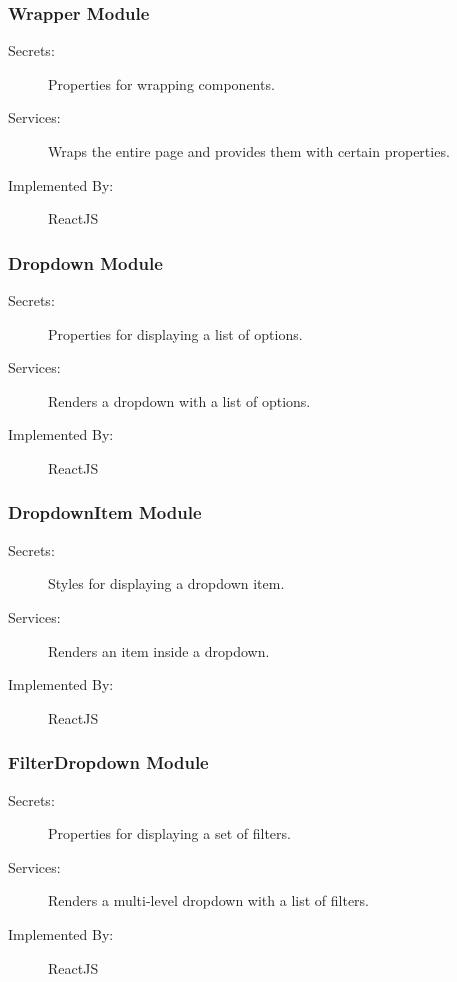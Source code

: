 \documentclass[12pt, titlepage]{article}
\begin{document}
\subsubsection{Wrapper Module \label{mWrapperModule}}
\begin{description}
\item[Secrets:]Properties for wrapping components.
\item[Services:]Wraps the entire page and provides them with certain properties.
\item[Implemented By:] ReactJS
\end{description}

\subsubsection{Dropdown Module \label{mDropdownModule}}
\begin{description}
\item[Secrets:]Properties for displaying a list of options.
\item[Services:]Renders a dropdown with a list of options.
\item[Implemented By:] ReactJS
\end{description}

\subsubsection{DropdownItem Module \label{mDropdownItemModule}}
\begin{description}
\item[Secrets:]Styles for displaying a dropdown item.
\item[Services:]Renders an item inside a dropdown.
\item[Implemented By:] ReactJS
\end{description}

\subsubsection{FilterDropdown Module \label{mFilterDropdownModule}}
\begin{description}
\item[Secrets:]Properties for displaying a set of filters.
\item[Services:]Renders a multi-level dropdown with a list of filters.
\item[Implemented By:] ReactJS
\end{description}
\end{document}
